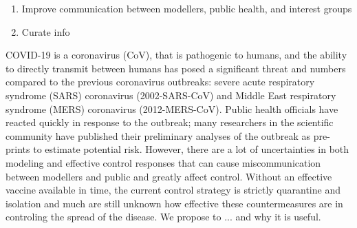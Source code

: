\begin{enumerate}
\item{Improve communication between modellers, public health, and interest groups}
\item{Curate info}
\end{enumerate}


COVID-19 is a coronavirus (CoV), that is pathogenic to humans, and the ability to directly transmit between humans has posed a significant threat and numbers compared to the previous coronavirus outbreaks: severe acute respiratory syndrome (SARS) coronavirus (2002-SARS-CoV) and Middle East respiratory syndrome (MERS) coronavirus (2012-MERS-CoV). 
Public health officials have reacted quickly in response to the outbreak; many researchers in the scientific community have published their preliminary analyses of the outbreak as pre-prints to estimate potential risk. 
However, there are a lot of uncertainties in both modeling and effective control responses that can cause miscommunication between modellers and public and greatly affect control.   
Without an effective vaccine available in time, the current control strategy is strictly quarantine and isolation and much are still unknown how effective these countermeasures are in controling the spread of the disease.  
We propose to ... and why it is useful. 










